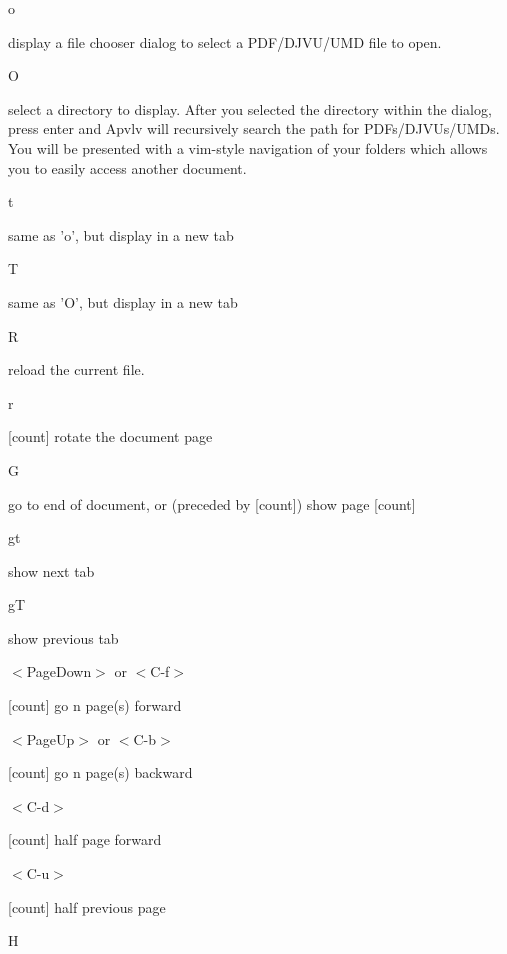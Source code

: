 \documentclass[a4paper,12pt]{article}
\newcommand{\apvlv}{\textsf{Apvlv{ }}}
\begin{document}
\begin{description}

\item o

display a file chooser dialog to select a PDF/\-DJVU/\-UMD file to open.

\item O

select a directory to display. After you selected the directory within the dialog, press enter and \apvlv will recursively search the path for PDFs/DJVUs/UMDs. You will be presented with a vim-style navigation of your folders which allows you to easily access another document.

\item t

same as 'o', but display in a new tab

\item T

same as 'O', but display in a new tab

\item R

reload the current file.

\item r

[count] rotate the document page 

\item G

  go to end of document, or (preceded by [count]) show page [count]

\item gt

show next tab

\item gT

show previous tab

\item $<$PageDown$>$ or $<$C-f$>$

[count] go n page(s) forward

\item $<$PageUp$>$ or
$<$C-b$>$

[count] go n page(s) backward

\item $<$C-d$>$

[count] half page forward

\item $<$C-u$>$

[count] half previous page 

\item H


\end{description}
\end{document}
